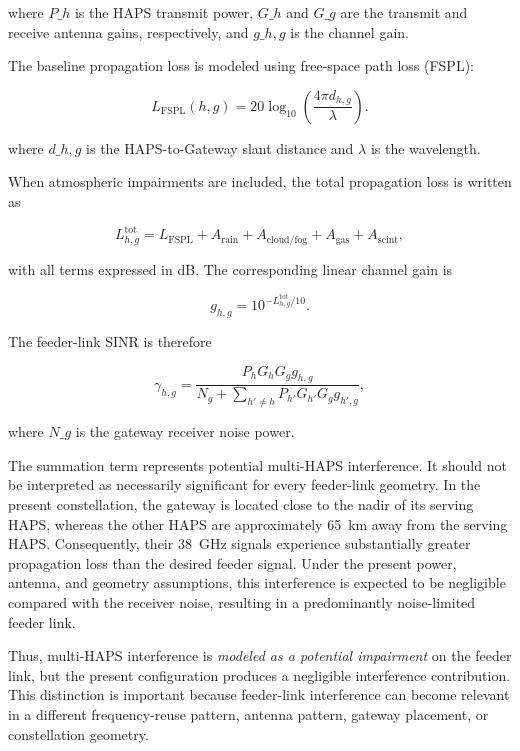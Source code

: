 \documentclass[conference]{IEEEtran}
\begin{document}
where $P\_h$ is the HAPS transmit power, $G\_h$ and $G\_g$ are the transmit and receive antenna gains, respectively, and $g\_{h,g}$ is the channel gain.

The baseline propagation loss is modeled using free-space path loss (FSPL):

\begin{equation}
L_{\mathrm{FSPL}}(h,g)
=
20\log_{10}
\left(
\frac{4\pi d_{h,g}}{\lambda}
\right).
\end{equation}

where $d\_{h,g}$ is the HAPS-to-Gateway slant distance and $\lambda$ is the wavelength.

When atmospheric impairments are included, the total propagation loss is written as

\begin{equation}
L_{h,g}^{\mathrm{tot}}
= L_{\mathrm{FSPL}}
+ A_{\mathrm{rain}}
+ A_{\mathrm{cloud/fog}}
+ A_{\mathrm{gas}}
+ A_{\mathrm{scint}},
\end{equation}

with all terms expressed in dB. The corresponding linear channel gain is

\begin{equation}
g_{h,g}
= 10^{-L_{h,g}^{\mathrm{tot}}/10}.
\end{equation}

The feeder-link SINR is therefore

\begin{equation}
\gamma_{h,g}
=
\frac{
P_h G_h G_g g_{h,g}
}{
N_g + \displaystyle\sum_{h'\neq h}
P_{h'}G_{h'}G_g g_{h',g}
},
\label{eq:feeder-sinr}
\end{equation}

where $N\_g$ is the gateway receiver noise power.

The summation term represents potential multi-HAPS interference. It should not be interpreted as necessarily significant for every feeder-link geometry. In the present constellation, the gateway is located close to the nadir of its serving HAPS, whereas the other HAPS are approximately 65~km away from the serving HAPS. Consequently, their 38~GHz signals experience substantially greater propagation loss than the desired feeder signal. Under the present power, antenna, and geometry assumptions, this interference is expected to be negligible compared with the receiver noise, resulting in a predominantly noise-limited feeder link.

Thus, multi-HAPS interference is \emph{modeled as a potential impairment} on the feeder link, but the present configuration produces a negligible interference contribution. This distinction is important because feeder-link interference can become relevant in a different frequency-reuse pattern, antenna pattern, gateway placement, or constellation geometry.
\end{document}
